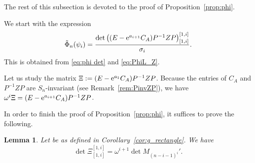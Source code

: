 \documentclass[pdftex]{sigma}
\numberwithin{equation}{section}
\newcommand{\fac}{\psi}
\newtheorem{Lemma}[Theorem]{Lemma}
\theoremstyle{definition}
\begin{document}
The rest of this subsection is devoted to the proof of Proposition~\ref{prop:phi}.


We start with the expression
\[
\tilde{\Phi}_n(\fac_i)=
\frac{\det\left((E-{\rm e}^{a_{i+1}}C_A )P^{-1}ZP\right)_{[1,i]}^{[1,i]}}{\sigma_i}.
\]
This is obtained from
\eqref{eq:phi det} and
\eqref{eq:PhiL_Z}.



Let us study the matrix
$
\Xi:=
(E-{\rm e}^{a_1}C_A)P^{-1}ZP$.
Because the entries of $C_A$ and $P^{-1}ZP$ are $S_n$-invariant (see Remark~\ref{rem:PinvZP}),
we have
$
 \omega^i \Xi=
(E-{\rm e}^{a_{i+1}}C_A)P^{-1}ZP$.

In order to finish the proof of Proposition~\ref{prop:phi}, it suffices to prove the following.
\begin{Lemma}\label{lem:det Xi}
Let  be as defined in Corollary~{\rm\ref{cor:g_rectangle}}.
We have
\begin{equation}
\det \Xi_{[1,i]}^{[1,i]}=\omega^{i+1} \det M_{(n-i-1)^i}'.
\label{eq:det Xi}
\end{equation}
\end{Lemma}
\end{document}
